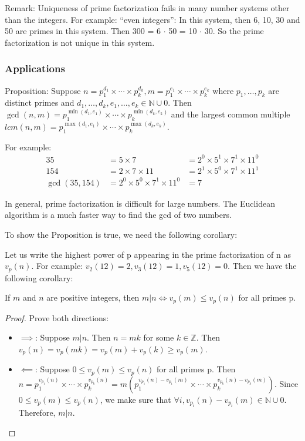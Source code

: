 \documentclass[letterpaper,12pt,oneside]{article}
\begin{document}
Remark: Uniqueness of prime factorization fails in many number systems other
than the integers. For example: ``even integers'': In this system, then 6, 10,
30 and 50 are primes in this system. Then 300 = 6 $\cdot$ 50 = 10 $\cdot$ 30.
So the prime factorization is not unique in this system.

\subsubsection{Applications}
Proposition: Suppose $n=p_1^{d_1}\times \cdots \times p_k^{d_k}, m =
    p_1^{e_1}\times \cdots \times p_k^{e_k}$ where $p_1,\ldots,p_k$ are distinct
primes and $d_1,\ldots,d_k,e_1,\ldots,e_k \in \mathbb{N}\cup 0$. Then
$\gcd(n,m) = p_1^{\min(d_1,e_1)}\times \cdots \times p_k^{\min(d_k,e_k)}$ and
the largest common multiple $lcm(n,m) = p_1^{\max(d_1,e_1)}\times \cdots \times
    p_k^{\max(d_k,e_k)}$.

For example: \begin{align*}
    35           & =5\times7                            & = 2^0\times 5^1\times 7^1\times 11^0 \\
    154          & = 2\times7\times11                   & = 2^1\times 5^0\times 7^1\times 11^1 \\
    \gcd(35,154) & = 2^0\times 5^0\times 7^1\times 11^0 & = 7
\end{align*}

In general, prime factorization is difficult for large numbers. The Euclidean
algorithm is a much faster way to find the gcd of two numbers.

To show the Proposition is true, we need the following corollary:

Let us write the highest power of p appearing in the prime factorization of n
as $v_p(n)$. For example: $v_2(12) = 2, v_3(12) = 1, v_5(12) = 0$. Then we have
the following corollary:

If $m$ and $n$ are positive integers, then $m | n \iff v_p(m) \leq v_p(n)$ for
all primes p.\begin{proof}
    Prove both directions:
    \begin{itemize}
        \item $\implies$: Suppose $m | n$. Then $n = mk$ for some $k \in \mathbb{Z}$. Then $v_p(n) = v_p(mk) = v_p(m) + v_p(k) \ge v_p(m)$.
        \item $\impliedby$: Suppose $0\leq v_p(m) \leq v_p(n)$ for all primes p. Then $n = p_1^{v_{p_1}(n)}\times \cdots \times p_k^{v_{p_k}(n)} = m(p_1^{v_{p_1}(n)-v_{p_1}(m)}\times \cdots \times p_k^{v_{p_k}(n)-v_{p_k}(m)})$. Since $0\leq v_p(m) \leq v_p(n)$, we make sure that $\forall i, v_{p_i}(n)-v_{p_i}(m) \in \mathbb{N}\cup 0$. Therefore, $m | n$.
    \end{itemize}
\end{proof}
\end{document}
